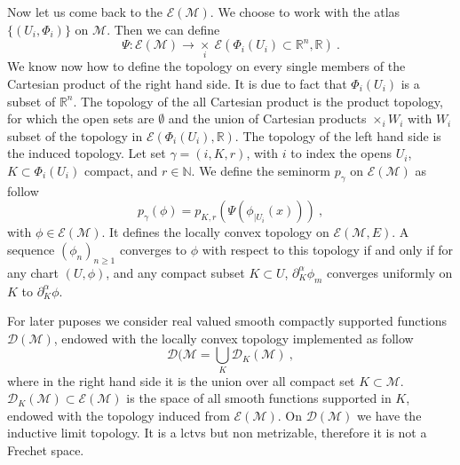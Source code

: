 \documentclass[12pt]{book}
\newcommand{\abs}[1]{\left|#1\right|}
\newcommand{\sm}[1]{\left\langle#1\right\rangle}
\let\int\int
\newcommand{\Dcal}{\mathcal{D}}
\newcommand{\Ecal}{\mathcal{E}}
\newcommand{\Mcal}{\mathcal{M}}
\newcommand{\Nbb}{\mathbb{N}}
\newcommand{\Rbb}{\mathbb{R}}
\newcommand{\dsf}{\mathsf{d}}
\theoremstyle{break}
\begin{document}


Now let us come back to the $\Ecal(\Mcal)$. We choose to work with the atlas $\{(U_i,\Phi_i)\}$ on $\Mcal$. Then we can define
%
\begin{equation*}
\Psi : \Ecal(\Mcal) \to \underset{i}{\times} \ \Ecal\left(\Phi_i(U_i) \subset \Rbb^n , \Rbb \right) \ .
\end{equation*}
%
We know now how to define the topology on every single members of the Cartesian product of the right hand side. It is due to fact that $\Phi_i(U_i)$ is a subset of $\Rbb^n$. The topology of the all Cartesian product is the product topology, for which the open sets are $\emptyset$ and the union of Cartesian products $\times_i W_i$ with $W_i$ subset of the topology in $ \Ecal\left(\Phi_i(U_i) , \Rbb \right)$. The topology of the left hand side is the induced topology. Let set $\gamma = (i, K, r)$, with $i$ to index the opens $U_i$, $K \subset \Phi_i(U_i)$ compact, and $r \in \Nbb$. We define the seminorm $p_\gamma$ on $\Ecal(\Mcal)$ as follow
%
\begin{equation*}
p_\gamma(\phi) = p_{K,r}\left( \Psi\left( \phi_{|U_i}(x) \right) \right) \ ,
\end{equation*}
%
with $\phi \in \Ecal\left(\Mcal \right)$. It defines the locally convex topology on $\Ecal\left(\Mcal , E \right)$. A sequence $(\phi_n)_{n\geq 1}$ converges to $\phi$ with respect to this topology if and only if for any chart $(U,\phi)$, and any compact subset $K \subset U$, $\partial^\alpha_K \phi_m$ converges uniformly on $K$ to $\partial^\alpha_K \phi$.




For later puposes we consider real valued smooth compactly supported functions $\Dcal(\Mcal)$, endowed with the locally convex topology implemented as follow
%
\begin{equation*}
\Dcal(\Mcal = \bigcup_{K} \Dcal_K(\Mcal) \ ,
\end{equation*}
%
where in the right hand side it is the union over all compact set $K \subset \Mcal$. $\Dcal_K(\Mcal) \subset \Ecal(\Mcal)$ is the space of all smooth functions supported in $K$, endowed with the topology induced from $\Ecal(\Mcal)$. On $\Dcal(\Mcal)$ we have the inductive limit topology. It is a lctvs but non metrizable, therefore it is not a Frechet space. 





%
\end{document}
